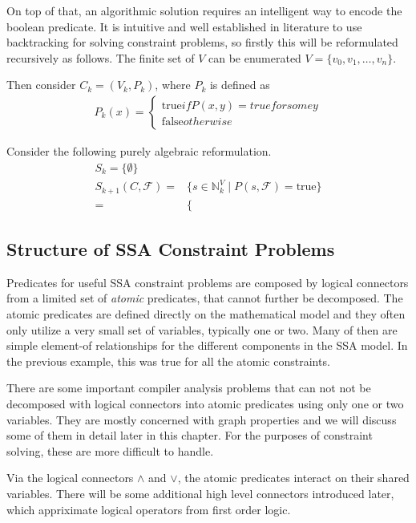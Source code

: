     On top of that, an algorithmic solution requires an intelligent way to
    encode the boolean predicate.
    It is intuitive and well established in literature to use backtracking for
    solving constraint problems, so firstly this will be reformulated
    recursively as follows.
    The finite set of $V$ can be enumerated $V=\{v_0,v_1,\dots,v_n\}$.

    Then consider $C_k=(V_k,P_k)$, where $P_k$ is defined as
    \begin{align*}
        P_k(x)=\left\{\begin{array}{l}\text{true} if P(x,y)=true for some y\\
                                      \text{false} otherwise\end{array}\right.
    \end{align*}

    Consider the following purely algebraic reformulation.
    \begin{align*}
        S_k=\{\emptyset\}\\
        S_{k+1}(C,\mathcal F)=&\{s\in\mathbb N^V_k\mid P(s,\mathcal F)=\text{true}\}\\
                             =&\{
    \end{align*}

\subsection{Structure of SSA Constraint Problems}

    Predicates for useful SSA constraint problems are composed by logical
    connectors from a limited set of {\em atomic} predicates, that cannot
    further be decomposed.
    The atomic predicates are defined directly on the mathematical model and
    they often only utilize a very small set of variables, typically one or two.
    Many of then are simple element-of relationships for the different
    components in the SSA model.
    In the previous example, this was true for all the atomic constraints.

    There are some important compiler analysis problems that can not not be
    decomposed with logical connectors into atomic predicates using only one
    or two variables.
    They are mostly concerned with graph properties and we will discuss some of
    them in detail later in this chapter.
    For the purposes of constraint solving, these are more difficult to handle.

    Via the logical connectors $\land$ and $\lor$, the atomic predicates
    interact on their shared variables.
    There will be some additional high level connectors introduced later, which
    appriximate logical operators from first order logic.

